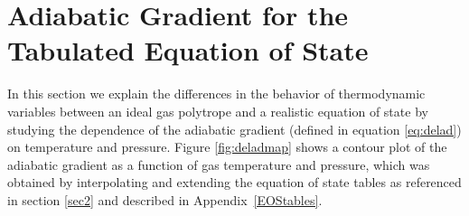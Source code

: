 \documentclass[apj]{emulateapj}
\newcommand{\App}[1]{Appendix~\ref{#1}}
\begin{document}
%
%
%

\section{Adiabatic Gradient for the Tabulated Equation of State}
\label{deladtable}



In this section we explain the differences in the behavior of thermodynamic variables between an ideal gas polytrope and a realistic equation of state by studying the dependence of the adiabatic gradient (defined in equation \ref{eq:delad}) on temperature and pressure. Figure \ref{fig:deladmap} shows a contour plot of the adiabatic gradient as a function of gas temperature and pressure, which was obtained by interpolating and extending the \citet{saumon95} equation of state tables as referenced in section \ref{sec2} and described in \App{EOStables}.
\end{document}
